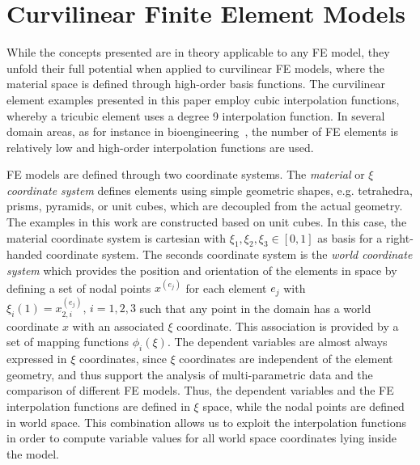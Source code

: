 \documentclass[journal]{vgtc}                %
\begin{document}
\section{Curvilinear Finite Element Models}\label{sec:theory}

While the concepts presented are in theory applicable to any FE model, they unfold their full potential when applied to curvilinear FE models, where the material space is defined through high-order basis functions. The curvilinear element examples presented in this paper employ cubic interpolation functions, whereby a tricubic element uses a degree 9 interpolation function. In several domain areas, as for instance in bioengineering~\cite{lee10deformation,wuensche03deformation}, the number of FE elements is relatively low and high-order interpolation functions are used.

FE models are defined through two coordinate systems. The \emph{material} or \emph{$\xi$ coordinate system} defines elements using simple geometric shapes, e.g. tetrahedra, prisms, pyramids, or unit cubes, which are decoupled from the actual geometry. The examples in this work are constructed based on unit cubes. In this case, the material coordinate system is cartesian with $\xi_1, \xi_2, \xi_3 \in [0,1]$ as basis for a right-handed coordinate system. The seconds coordinate system is the \emph{world coordinate system} which provides the position and orientation of the elements in space by defining a set of nodal points $x^{(e_j)}$ for each element $e_j$ with $\xi_i(1)=x^{(e_j)}_{2,i},\, i=1,2,3$ such that any point in the domain has a world coordinate $x$ with an associated $\xi$ coordinate. This association is provided by a set of mapping functions $\phi_i(\xi)$. The dependent variables are almost always expressed in $\xi$ coordinates, since $\xi$ coordinates are independent of the element geometry, and thus support the analysis of multi-parametric data and the comparison of different FE models. Thus, the dependent variables and the FE interpolation functions are defined in $\xi$ space, while the nodal points are defined in world space. This combination allows us to exploit the interpolation functions in order to compute variable values for all world space coordinates lying inside the model.
\end{document}
